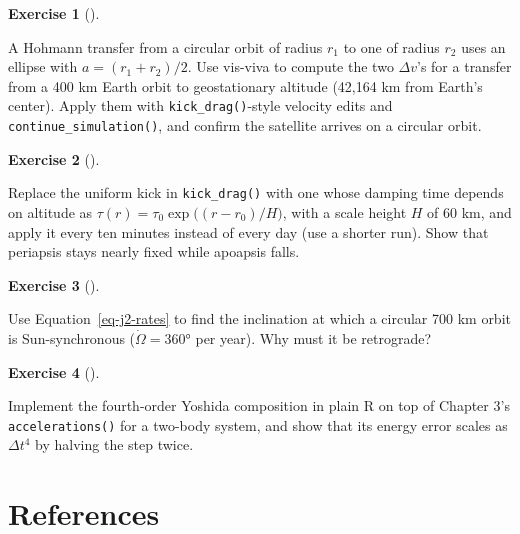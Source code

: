 \documentclass[
  10.5pt,
  letterpaper,
]{scrbook}
\theoremstyle{definition}
\newtheorem{exercise}{Exercise}[chapter]
\theoremstyle{plain}
\theoremstyle{remark}
\begin{document}
\begin{exercise}[]\protect\hypertarget{exr-ch16-hohmann}{}\label{exr-ch16-hohmann}

A Hohmann transfer from a circular orbit of radius \(r_1\) to one of
radius \(r_2\) uses an ellipse with \(a = (r_1+r_2)/2\). Use vis-viva to
compute the two \(\Delta v\)'s for a transfer from a 400 km Earth orbit
to geostationary altitude (42,164 km from Earth's center). Apply them
with \texttt{kick\_drag()}-style velocity edits and
\texttt{continue\_simulation()}, and confirm the satellite arrives on a
circular orbit.

\end{exercise}

\begin{exercise}[]\protect\hypertarget{exr-ch16-real-drag}{}\label{exr-ch16-real-drag}

Replace the uniform kick in \texttt{kick\_drag()} with one whose damping
time depends on altitude as
\(\tau(r) = \tau_0\exp\big((r - r_0)/H\big)\), with a scale height \(H\)
of 60 km, and apply it every ten minutes instead of every day (use a
shorter run). Show that periapsis stays nearly fixed while apoapsis
falls.

\end{exercise}

\begin{exercise}[]\protect\hypertarget{exr-ch16-sun-sync}{}\label{exr-ch16-sun-sync}

Use Equation~\ref{eq-j2-rates} to find the inclination at which a
circular 700 km orbit is Sun-synchronous (\(\dot\Omega = 360°\) per
year). Why must it be retrograde?

\end{exercise}

\begin{exercise}[]\protect\hypertarget{exr-ch16-yoshida}{}\label{exr-ch16-yoshida}

Implement the fourth-order Yoshida composition in plain R on top of
Chapter 3's \texttt{accelerations()} for a two-body system, and show
that its energy error scales as \(\Delta t^4\) by halving the step
twice.

\end{exercise}


\chapter*{References}\label{references}
\end{document}
